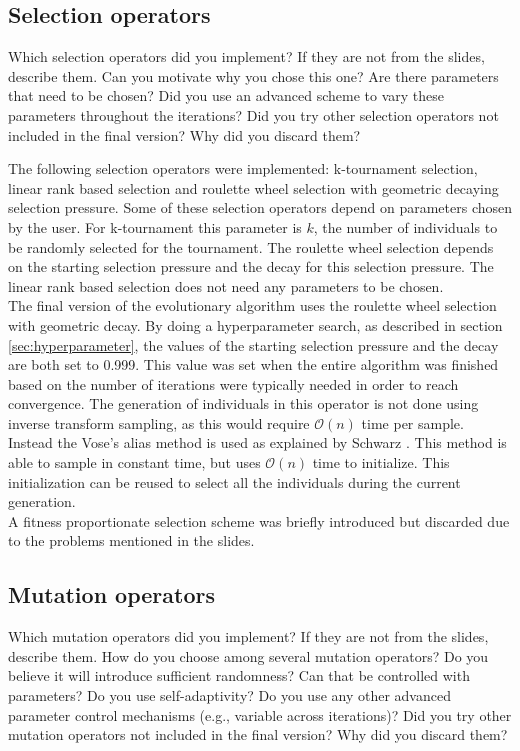 \documentclass[a4paper,10pt]{article}
\newcommand{\ReplaceMe}[1]{{\color{blue}#1}}
\begin{document}
\subsection{Selection operators}

\ReplaceMe{Which selection operators did you implement? If they are not from the slides, describe them. Can you motivate why you chose this one? Are there parameters that need to be chosen? Did you use an advanced scheme to vary these parameters throughout the iterations? Did you try other selection operators not included in the final version? Why did you discard them?}

The following selection operators were implemented: k-tournament selection, linear rank based selection and roulette wheel selection with geometric decaying selection pressure. Some of these selection operators depend on parameters chosen by the user. For k-tournament this parameter is $k$, the number of individuals to be randomly selected for the tournament. The roulette wheel selection depends on the starting selection pressure and the decay for this selection pressure. The linear rank based selection does not need any parameters to be chosen.\\
The final version of the evolutionary algorithm uses the roulette wheel selection with geometric decay. By doing a hyperparameter search, as described in section \ref{sec:hyperparameter}, the values of the starting selection pressure and the decay are both set to 0.999. This value was set when the entire algorithm was finished based on the number of iterations were typically needed in order to reach convergence. The generation of individuals in this operator is not done using inverse transform sampling, as this would require $\mathcal{O}(n)$ time per sample. Instead the Vose's alias method is used as explained by Schwarz \cite{schwarz, vose}. This method is able to sample in constant time, but uses $\mathcal{O}(n)$ time to initialize. This initialization can be reused to select all the individuals during the current generation.\\
A fitness proportionate selection scheme was briefly introduced but discarded due to the problems mentioned in the slides.

\subsection{Mutation operators} \label{sec:mutation}

\ReplaceMe{Which mutation operators did you implement? If they are not from the slides, describe them. How do you choose among several mutation operators? Do you believe it will introduce sufficient randomness? Can that be controlled with parameters? Do you use self-adaptivity? Do you use any other advanced parameter control mechanisms (e.g., variable across iterations)? Did you try other mutation operators not included in the final version? Why did you discard them?}
\end{document}
